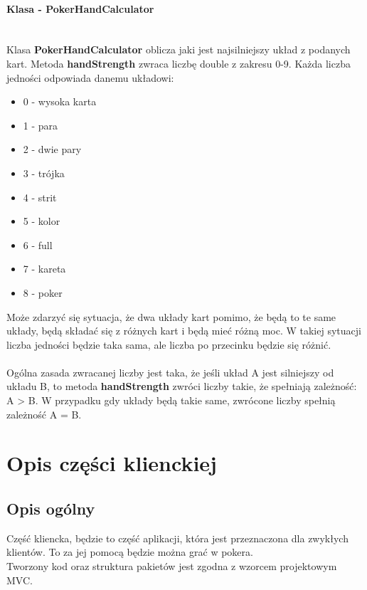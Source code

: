 \documentclass{article}
\newcommand{\mparagraph}[1]{\paragraph{#1}\mbox{}\vspace{2mm}\\}
\begin{document}
            \mparagraph{Klasa - PokerHandCalculator}
                Klasa \textbf{PokerHandCalculator} oblicza jaki jest najsilniejszy układ z podanych kart.
                Metoda \textbf{handStrength} zwraca liczbę double z zakresu 0-9.
                Każda liczba jedności odpowiada danemu układowi:
                \begin{itemize}
                    \item 0 - wysoka karta
                    \item 1 - para
                    \item 2 - dwie pary
                    \item 3 - trójka
                    \item 4 - strit
                    \item 5 - kolor
                    \item 6 - full
                    \item 7 - kareta
                    \item 8 - poker
                \end{itemize}
                Może zdarzyć się sytuacja, że dwa układy kart pomimo, że będą to te same układy, będą składać się z różnych kart i będą mieć różną moc. W takiej sytuacji liczba jedności będzie taka sama, ale liczba po przecinku będzie się różnić.
                \\\\
                Ogólna zasada zwracanej liczby jest taka, że jeśli układ A jest silniejszy od układu B, to metoda \textbf{handStrength} zwróci liczby takie, że spełniają zależność: A > B.
                W przypadku gdy układy będą takie same, zwrócone liczby spełnią zależność A = B.

\section{Opis części klienckiej}
    \subsection{Opis ogólny}
        Część kliencka, będzie to część aplikacji, która jest przeznaczona dla zwykłych klientów.
        To za jej pomocą będzie można grać w pokera.
        \\
        Tworzony kod oraz struktura pakietów jest zgodna z wzorcem projektowym MVC.
    
\end{document}
